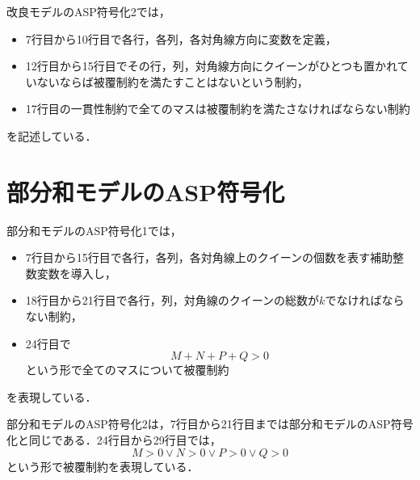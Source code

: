 

\newpage
改良モデルのASP符号化2では，
\begin{itemize}
 \item 7行目から10行目で各行，各列，各対角線方向に変数を定義，
 \item 12行目から15行目でその行，列，対角線方向にクイーンがひとつも置かれていないならば被覆制約を満たすことはないという制約，
 \item 17行目の一貫性制約で全てのマスは被覆制約を満たさなければならない制約
\end{itemize}
を記述している．
\newpage
\section{部分和モデルのASP符号化}



部分和モデルのASP符号化1では，
\begin{itemize}
 \item 7行目から15行目で各行，各列，各対角線上のクイーンの個数を表す補助整数変数を導入し，
 \item 18行目から21行目で各行，列，対角線のクイーンの総数が$k$でなければならない制約， 
 \item 24行目で\[
													  M+N+P+Q>0   
													 \]
という形で全てのマスについて被覆制約
\end{itemize}
を表現している．



\newpage
部分和モデルのASP符号化2は，7行目から21行目までは部分和モデルのASP符号化と同じである．24行目から29行目では，\[
												 M>0 \vee N>0 \vee P>0 \vee Q>0
												  \]
という形で被覆制約を表現している．


